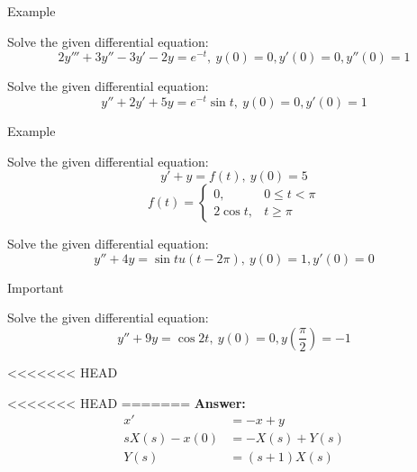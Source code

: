 \documentclass[11pt]{beamer}
\theoremstyle{plain}
\begin{document}
\begin{frame}{Example}
    \begin{example}
        Solve the given differential equation:
        $$2y'''+3y''-3y'-2y=e^{-t},\:y(0)=0,y'(0)=0,y''(0)=1$$
    \end{example}
    \begin{example}
        Solve the given differential equation:
        $$y''+2y'+5y=e^{-t}\sin t,\:y(0)=0,y'(0)=1$$        
    \end{example}
\end{frame}
\begin{frame}{Example}
    \begin{example}
        Solve the given differential equation:
        $$y'+y=f(t),\: y(0)=5$$
        $$f(t)=\begin{cases}
        0, & 0\le t<\pi\\
        2\cos t, & t\ge \pi
        \end{cases}$$        
    \end{example}
    \begin{example}
        Solve the given differential equation:
        $$y''+4y=\sin t u(t-2\pi),\: y(0)=1,y'(0)=0$$     
    \end{example}
\end{frame}
\begin{frame}{Important}
    \begin{example}
        Solve the given differential equation:
        $$y''+9y=\cos 2t,\: y(0)=0,y\left(\frac\pi2\right)=-1$$     
    \end{example}
<<<<<<< HEAD
<<<<<<< HEAD
=======
    \textbf{Answer:} 
    \begin{align*}
        x'&=-x+y\\
        sX(s)-x(0)&=-X(s)+Y(s)\\
        Y(s)&=(s+1)X(s)
    \end{align*} 
\end{frame}
\end{document}
